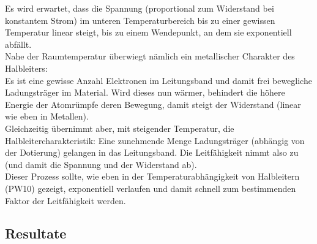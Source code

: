 \documentclass[12pt,a4paper]{article}
\begin{document}
\begin{multicols}{2}
Es wird erwartet, dass die Spannung (proportional zum Widerstand bei konstantem Strom) im unteren Temperaturbereich bis zu einer gewissen Temperatur linear steigt, bis zu einem Wendepunkt, an dem sie exponentiell abfällt.\\
Nahe der Raumtemperatur überwiegt nämlich ein metallischer Charakter des Halbleiters:\\
Es ist eine gewisse Anzahl Elektronen im  Leitungsband und damit frei bewegliche Ladungsträger im Material. Wird dieses nun wärmer, behindert die höhere Energie der Atomrümpfe deren Bewegung, damit steigt der Widerstand (linear wie eben in Metallen).\\
Gleichzeitig übernimmt aber, mit steigender Temperatur, die Halbleitercharakteristik: Eine zunehmende Menge Ladungsträger (abhängig von der Dotierung) gelangen in das Leitungsband. Die Leitfähigkeit nimmt also zu (und damit die Spannung und der Widerstand ab).\\
Dieser Prozess sollte, wie eben in der Temperaturabhängigkeit von Halbleitern (PW10) gezeigt, exponentiell verlaufen und damit schnell zum bestimmenden Faktor der Leitfähigkeit werden.



\end{multicols}

\subsection{Resultate}
\end{document}
